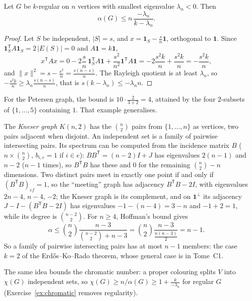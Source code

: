 \begin{theorem}\label{thm:hoffman}
Let $G$ be $k$-regular on $n$ vertices with smallest eigenvalue $\lambda_n<0$. Then
\[
\alpha(G)\le n\,\frac{-\lambda_n}{k-\lambda_n}.
\]
\end{theorem}
\begin{proof}
Let $S$ be independent, $|S|=s$, and $x=\mathbf 1_S-\frac sn\mathbf 1$, orthogonal to $\mathbf 1$. Since $\mathbf 1_S^{\mathsf T}A\mathbf 1_S=2\,
|E(S)|=0$ and $A\mathbf 1=k\mathbf 1$,
\[
x^{\mathsf T}Ax=0-2\frac sn\,\mathbf 1_S^{\mathsf T}A\mathbf 1+\frac{s^2}{n^2}\mathbf 1^{\mathsf T}A\mathbf 1=-2\frac{s^2k}n+\frac{s^2k}n=-\frac{s^2k}n,
\]
and $\|x\|^2=s-\frac{s^2}n=\frac{s(n-s)}n$. The Rayleigh quotient is at least $\lambda_n$, so $-\frac{s^2k}n\ge\lambda_n\frac{s(n-s)}n$,
that is $s(k-\lambda_n)\le-\lambda_nn$.
\end{proof}

For the Petersen graph, the bound is $10\cdot\frac2{3+2}=4$, attained by the four $2$-subsets of $\{1,\dots,5\}$ containing $1$.
That example generalises.

\begin{example}\label{exa:ekr}
The \emph{Kneser graph} $K(n,2)$ has the $\binom n2$ pairs from $\{1,\dots,n\}$ as vertices, two pairs adjacent when disjoint. An
independent set is a family of pairwise intersecting pairs. Its spectrum can be computed from the incidence matrix $B$ ($n\times
\binom n2$, $b_{i,e}=1$ if $i\in e$): $BB^{\mathsf T}=(n-2)I+J$ has eigenvalues $2(n-1)$ and $n-2$ ($n-1$ times), so $B^{\mathsf T}B$
has these and $0$ for the remaining $\binom n2-n$ dimensions. Two distinct pairs meet in exactly one point if and only if
$(B^{\mathsf T}B)_{ef}=1$, so the ``meeting'' graph has adjacency $B^{\mathsf T}B-2I$, with eigenvalues $2n-4$, $n-4$, $-2$; the
Kneser graph is its complement, and on $\mathbf 1^\perp$ its adjacency $J-I-(B^{\mathsf T}B-2I)$ has eigenvalues $-1-(n-4)=3-n$ and
$-1+2=1$, while its degree is $\binom{n-2}2$. For $n\ge4$, Hoffman's bound gives
\[
\alpha\le\binom n2\frac{n-3}{\binom{n-2}2+n-3}=\binom n2\frac{n-3}{\frac{n(n-3)}2}=n-1.
\]
So a family of pairwise intersecting pairs has at most $n-1$ members: the case $k=2$ of the Erd\H{o}s--Ko--Rado theorem, whose
general case is in Tome~C1.
\end{example}

The same idea bounds the chromatic number: a proper colouring splits $V$ into $\chi(G)$ independent sets, so
$\chi(G)\ge n/\alpha(G)\ge1+\frac k{-\lambda_n}$ for regular $G$ (Exercise~\ref{ex:chromatic} removes regularity).

